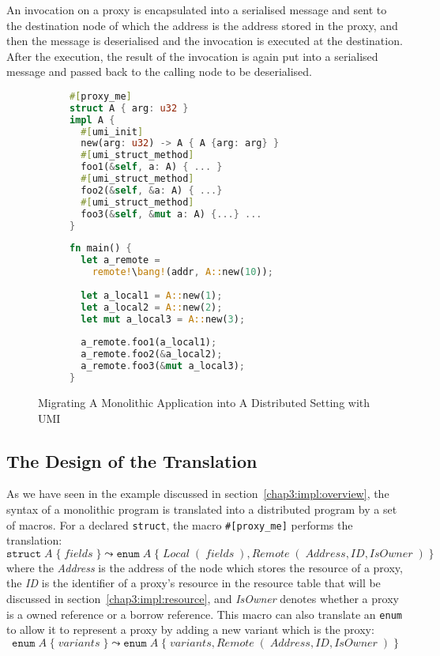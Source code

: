 An invocation on a proxy is encapsulated into a serialised message and sent to the destination node of which the address is the address stored in the proxy, and then the message is deserialised and the invocation is executed at the destination. After the execution, the result of the invocation is again put into a serialised message and passed back to the calling node to be deserialised.
\begin{figure}[t]
\centering
\begin{subfigure}[t]{0.53\textwidth}
    \centering
\begin{lstlisting}[language=Rust, style=boxed]
#[proxy_me]
struct A { arg: u32 }
impl A {
  #[umi_init]
  new(arg: u32) -> A { A {arg: arg} }
  #[umi_struct_method]
  foo1(&self, a: A) { ... }
  #[umi_struct_method]
  foo2(&self, &a: A) { ...}
  #[umi_struct_method]
  foo3(&self, &mut a: A) {...} ...
}
\end{lstlisting}
\end{subfigure}
\hfill
\begin{subfigure}[t]{0.45\textwidth}
    \centering
\begin{lstlisting}[language=Rust, style=boxed]
fn main() {
  let a_remote = 
    remote!\bang!(addr, A::new(10));
  
  let a_local1 = A::new(1);
  let a_local2 = A::new(2);
  let mut a_local3 = A::new(3);
  
  a_remote.foo1(a_local1);
  a_remote.foo2(&a_local2);
  a_remote.foo3(&mut a_local3);
}
\end{lstlisting}
\end{subfigure}
\vspace{1em}
\caption{Migrating A Monolithic Application into A Distributed Setting with UMI}
\label{chap3:impl:overview:fig}
\end{figure}

\subsection{The Design of the Translation}
\label{chap3:impl:proxy}
As we have seen in the example discussed in section~\ref{chap3:impl:overview}, the syntax of a monolithic program is translated into a distributed program by a set of macros. For a declared \texttt{struct}, the macro \texttt{\#[proxy\_me]} performs the translation:
\[
\texttt{struct}\; A\;\{\; \mathit{fields}\;\} \leadsto \texttt{enum}\; A\;\{\; \mathit{Local}\;(\;\mathit{fields}\;), \mathit{Remote}\;(\;\mathit{Address}, \mathit{ID}, \mathit{IsOwner}\;)\;\} 
\]
where the \textit{Address} is the address of the node which stores the resource of a proxy, the \textit{ID} is the identifier of a proxy's resource in the resource table that will be discussed in section~\ref{chap3:impl:resource}, and \textit{IsOwner} denotes whether a proxy is a owned reference or a borrow reference.
This macro can also translate an \texttt{enum} to allow it to represent a proxy by adding a new variant which is the proxy:
\[
\texttt{enum}\; A\;\{\; \mathit{variants}\;\} \leadsto \texttt{enum}\; A\;\{\; \mathit{variants}, \mathit{Remote}\;(\;\mathit{Address}, \mathit{ID}, \mathit{IsOwner}\;)\;\} 
\]

